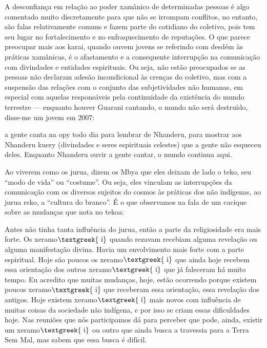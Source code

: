 \documentclass{article}
\begin{document}
A desconfian\c{c}a em rela\c{c}\~ao ao poder xam\^anico de determinadas
pessoas \'e algo comentado muito discretamente para que n\~ao se
irrompam conflitos, no entanto, s\~ao falas relativamente comuns e
fazem parte do cotidiano do coletivo, pois tem seu lugar no
fortalecimento e no enfraquecimento de reputa\c{c}\~oes. O que parece
preocupar mais aos karai, quando ouvem jovens se referindo com desd\'em
\`as pr\'aticas xam\^anicas, \'e o afastamento e a consequente
interrup\c{c}\~ao na comunica\c{c}\~ao com divindades e entidades
espirituais. Ou seja, n\~ao est\~ao preocupados se as pessoas n\~ao
declaram ades\~ao incondicional \`as cren\c{c}as do coletivo, mas com a
suspens\~ao das rela\c{c}\~oes com o conjunto das subjetividades n\~ao
humanas, em especial com aquelas respons\'aveis pela continuidade da
exist\^encia do mundo terrestre --- enquanto houver Guarani cantando, o
mundo n\~ao ser\'a destru\'ido, disse-me um jovem em 2007: 

a gente canta na opy todo dia para lembrar de Nhanderu, para mostrar aos
Nhanderu kuery (divindades e seres espirituais celestes) que a gente
n\~ao esqueceu deles. Enquanto Nhanderu ouvir a gente cantar, o mundo
continua aqui.

Ao viverem como os jurua, dizem os Mbya que eles deixam de lado o teko,
seu {\textquotedblleft}modo de vida{\textquotedblright} ou
{\textquotedblleft}costume{\textquotedblright}. Ou seja, eles vinculam
as interrup\c{c}\~oes da comunica\c{c}\~ao com os diversos sujeitos do
cosmos \`as pr\'aticas dos n\~ao ind\'igenas, ao jurua reko, a
{\textquotedblleft}cultura do branco{\textquotedblright}. \'E o que
observamos na fala de um cacique sobre as mudan\c{c}as que nota no
tekoa:

Antes n\~ao tinha tanta influ\^encia do jurua, ent\~ao a parte da
religiosidade era mais forte. Os xeramo$\text{\textgreek{~i}}$ quando
rezavam recebiam alguma revela\c{c}\~ao ou alguma manifesta\c{c}\~ao
divina. Havia um envolvimento mais forte com a parte espiritual. Hoje
s\~ao poucos os xeramo$\text{\textgreek{~i}}$ que ainda hoje recebem
essa orienta\c{c}\~ao dos outros xeramo$\text{\textgreek{~i}}$ que j\'a
faleceram h\'a muito tempo. Eu acredito que muitas mudan\c{c}as, hoje,
est\~ao ocorrendo porque existem poucos xeramo$\text{\textgreek{~i}}$
que receberam essa orienta\c{c}\~ao, essa revela\c{c}\~ao dos antigos.
Hoje existem xeramo$\text{\textgreek{~i}}$ mais novos com influ\^encia
de muitas coisas da sociedade n\~ao ind\'igena, e por isso se criam
essas dificuldades hoje. Nas reuni\~oes que n\'os participamos d\'a
para perceber que pode, ainda, existir um xeramo$\text{\textgreek{~i}}$
ou outro que ainda busca a travessia para a Terra Sem Mal, mas sabem
que essa busca \'e dif\'icil. 
\end{document}
